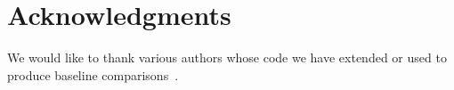 \documentclass[runningheads]{llncs}
\begin{document}
\section*{Acknowledgments}

We would like to thank various authors whose code we have extended or used to
produce baseline
comparisons~\cite{pfister2015flowing,chen2014articulated,cherian2014mixing}.





\end{document}
